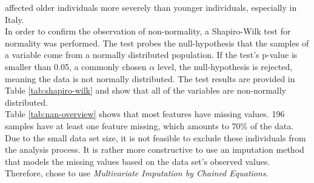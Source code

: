affected older individuals more severely than younger individuals, especially 
in Italy. 
\\
In order to confirm the observation of non-normality, a Shapiro-Wilk test for 
normality was performed.
The test probes the null-hypothesis that the samples of a variable come from a 
normally distributed population. If the test's p-value is smaller than 
0.05, a commonly chosen $\alpha$ level, the null-hypothesis is rejected, 
meaning the data is not normally distributed.
The test results are provided in Table \ref{tab:shapiro-wilk} and show 
that all of the variables are non-normally distributed.
\\
Table \ref{tab:nan-overview} shows that most features have missing values. 196 
samples have at least one feature missing, which amounts to 70\% of the data. 
Due to the small data set size, it is not feasible to exclude these 
individuals from the analysis process. It is rather more constructive to use an 
imputation method that models the missing values based on the data set's 
observed values. Therefore, \citeauthor{RN127} chose to use 
\textit{Multivariate 
Imputation by Chained Equations}. 
